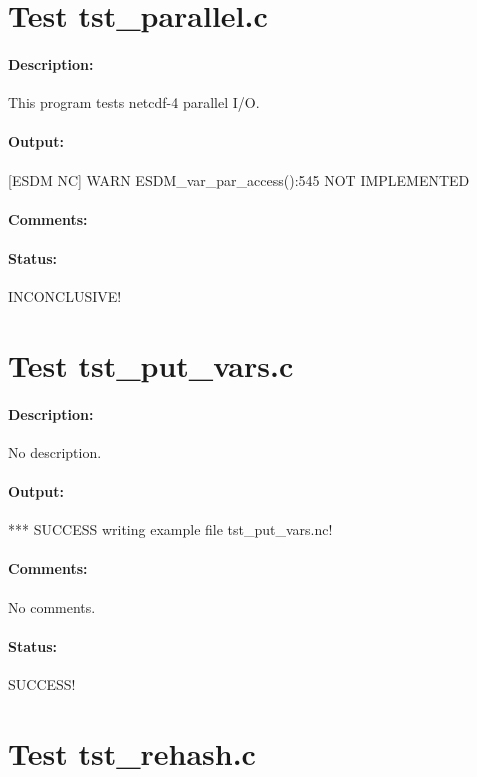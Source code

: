 \section{Test tst\_parallel.c}

\paragraph{Description:} This program tests netcdf-4 parallel I/O.

\paragraph{Output:} [ESDM NC] WARN ESDM\_var\_par\_access():545 NOT IMPLEMENTED

\paragraph{Comments:}

\paragraph{Status:} INCONCLUSIVE!

\section{Test tst\_put\_vars.c}

\paragraph{Description:} No description.

\paragraph{Output:} *** SUCCESS writing example file tst\_put\_vars.nc!

\paragraph{Comments:} No comments.

\paragraph{Status:} SUCCESS!

\section{Test tst\_rehash.c}

